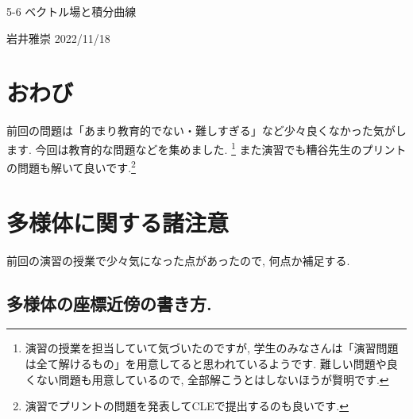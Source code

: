 \documentclass[dvipdfmx,a4paper,11pt]{article}
\theoremstyle{definition}
\begin{document}


\begin{center}
{\Large 5-6 ベクトル場と積分曲線}
\end{center}
\begin{flushright}
 岩井雅崇 2022/11/18
\end{flushright}

\section{おわび}
前回の問題は「あまり教育的でない・難しすぎる」など少々良くなかった気がします. 今回は教育的な問題などを集めました. \footnote{演習の授業を担当していて気づいたのですが, 学生のみなさんは「演習問題は全て解けるもの」を用意してると思われているようです. 難しい問題や良くない問題も用意しているので, 全部解こうとはしないほうが賢明です.}
また演習でも糟谷先生のプリントの問題も解いて良いです.\footnote{演習でプリントの問題を発表してCLEで提出するのも良いです.}



\section{多様体に関する諸注意}
前回の演習の授業で少々気になった点があったので, 何点か補足する.

\subsection{多様体の座標近傍の書き方.}
\end{document}
